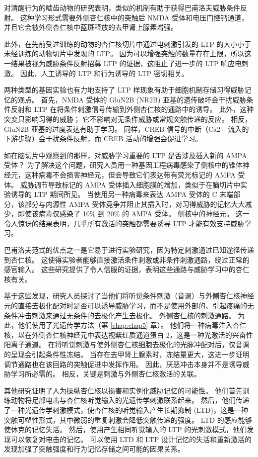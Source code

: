对清醒行为的啮齿动物的研究表明，类似的机制有助于获得巴甫洛夫威胁条件反射。 这种学习形式需要外侧杏仁核中的突触后 NMDA 受体和电压门控钙通道，并且它会被外侧杏仁核中蓝斑释放的去甲肾上腺素增强。

此外，在先前受过训练的动物的杏仁核切片中通过电刺激引发的 LTP 的大小小于未经训练的动物切片中发现的 LTP。 因为可以增强突触的数量存在上限，所以这一结果被视为威胁条件反射招募 LTP 的证据，这阻止了进一步的 LTP 响应电刺激。 因此，人工诱导的 LTP 和行为诱导的 LTP 密切相关。

两种类型的基因实验也有力地支持了 LTP 样现象有助于细胞机制存储习得威胁记忆的观点。 首先，NMDA 受体的 GluN2B (NR2B) 亚基的遗传破坏会干扰威胁条件反射和 LTP 在将条件刺激信号传输到外侧杏仁核的通路中的诱导。 此外，这种突变只影响习得的威胁； 它不影响对无条件威胁或常规突触传递的反应。 相反，GluN2B 亚基的过度表达有助于学习。 同样，CREB 信号的中断（Ca2+ 流入的下游步骤）会干扰条件反射，而 CREB 活动的增强会促进学习。

如在脑切片中观察到的那样，对威胁学习重要的 LTP 是否涉及插入新的 AMPA 受体？ 为了解决这个问题，研究人员用一种基因工程病毒感染了侧核中的锥体神经元，这种病毒不会损害神经元，但会导致它们表达带有荧光标记的 AMPA 受体。 威胁调节导致标记的 AMPA 受体插入细胞膜的增加，类似于在脑切片中实验诱导的 LTP 期间所见。 当使用另一种病毒来表达 AMPA 受体的 C 末端部分，该部分与内源性 AMPA 受体竞争并阻止其插入时，对习得威胁的记忆大大减少，即使该病毒仅感染了 10\% 到 20\% 的 AMPA 受体。 侧核中的神经元。 这一令人惊讶的结果表明，几乎所有激活的突触都需要诱导 LTP 才能有效支持威胁学习。

巴甫洛夫范式的优点之一是它易于进行实验研究，因为特定刺激通过已知途径传递到杏仁核。 这使得实验者能够直接激活条件刺激或非条件刺激通路，绕过正常的感官输入。 这些研究提供了令人信服的证据，表明这些通路与威胁学习中的杏仁核有关。

基于这些发现，研究人员探讨了当他们将听觉条件刺激（音调）与外侧杏仁核神经元的直接去极化配对时是否可以诱导威胁学习，而不是使用外部的、引起疼痛的无条件冲击刺激来通过无条件的去极化产生去极化。 外侧杏仁核的刺激通路。 为此，他们使用了光遗传学方法（第 \ref{chap:chap5} 章）。 他们将一种病毒注入杏仁核，以在外侧杏仁核神经元中表达视紫红质通道蛋白 2，这是一种光激活的兴奋性阳离子通道。 在将听觉刺激与使外侧杏仁核细胞去极化的光脉冲配对后，仅音调的呈现会引起条件性冻结。 当存在去甲肾上腺素时，冻结量更大，这进一步证明调节通路也在该回路的突触促进中发挥作用。 因此，厌恶冲击本身并不是诱导威胁学习所必需的。 相反，关键是刺激与外侧杏仁核激活的关联。

其他研究证明了人为操纵杏仁核以损害和实例化威胁记忆的可能性。 他们首先训练动物将足部电击与杏仁核听觉输入的光遗传学刺激联系起来。 然后，他们传递了一种光遗传学刺激模式，使杏仁核的听觉输入产生长期抑制 (LTD)，这是一种突触可塑性形式，其中微弱的重复刺激会降低突触传递的强度。 LTD 的感应能够使休克的记忆失活。 然后，使用产生相同听觉输入的 LTP 的光刺激模式，他们发现可以恢复对电击的记忆。 可以使用 LTD 和 LTP 设计记忆的失活和重新激活的发现加强了突触强度和行为记忆存储之间可能的因果关系。

